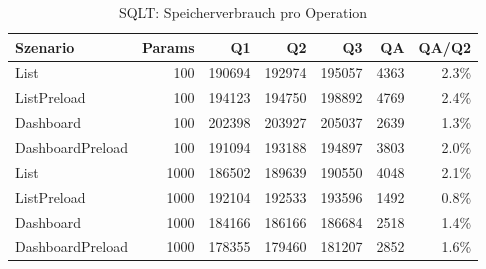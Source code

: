 \begin{table}[ht]
\centering
\caption{SQLT: Speicherverbrauch pro Operation}
\begin{tabular}{lrrrrrr}
\toprule
Szenario & Params & Q1 & Q2 & Q3 & QA & QA/Q2 \\
\midrule
		List & 100 & 190694 & 192974 & 195057 & 4363 & 2.3\% \\
		ListPreload & 100 & 194123 & 194750 & 198892 & 4769 & 2.4\% \\
		Dashboard & 100 & 202398 & 203927 & 205037 & 2639 & 1.3\% \\
		DashboardPreload & 100 & 191094 & 193188 & 194897 & 3803 & 2.0\% \\
		List & 1000 & 186502 & 189639 & 190550 & 4048 & 2.1\% \\
		ListPreload & 1000 & 192104 & 192533 & 193596 & 1492 & 0.8\% \\
		Dashboard & 1000 & 184166 & 186166 & 186684 & 2518 & 1.4\% \\
		DashboardPreload & 1000 & 178355 & 179460 & 181207 & 2852 & 1.6\% \\
\bottomrule
\end{tabular}
\label{tab:benchmark_sqlt_bytesperop}
\end{table}
	